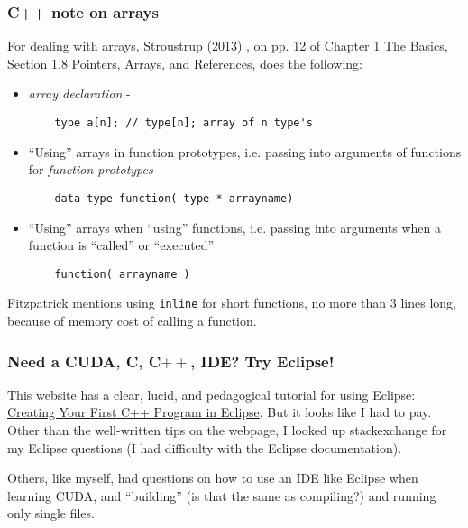 \documentclass[10pt]{amsart}
\begin{document}
\begin{multicols*}{2}
\subsubsection{C++ note on arrays}

For dealing with arrays, Stroustrup (2013) \cite{Stro2013}, on pp. 12 of Chapter 1 The Basics, Section 1.8 Pointers, Arrays, and References, does the following:

\begin{itemize}
\item \emph{array declaration} -
  \begin{lstlisting}
    type a[n]; // type[n]; array of n type's
  \end{lstlisting}
\item ``Using'' arrays in function prototypes, i.e. passing into arguments of functions for \emph{function prototypes}
  \begin{lstlisting}
    data-type function( type * arrayname)
    \end{lstlisting}
\item ``Using'' arrays when ``using'' functions, i.e. passing into arguments when a function is ``called'' or ``executed''
  \begin{lstlisting}
    function( arrayname )
  \end{lstlisting}
  \end{itemize}


Fitzpatrick \cite{Fitz} mentions using \verb|inline| for short functions, no more than 3 lines long, because of memory cost of calling a function.  




\subsubsection{Need a CUDA, C, C$++$, IDE?  Try Eclipse!}

This website has a clear, lucid, and pedagogical tutorial for using Eclipse: \href{https://www.fayewilliams.com/2011/06/28/creating-your-first-c-program-in-eclipse/}{Creating Your First C++ Program in Eclipse}.  But it looks like I had to pay.  Other than the well-written tips on the webpage, I looked up stackexchange for my Eclipse questions (I had difficulty with the Eclipse documentation).  

Others, like myself, had questions on how to use an IDE like Eclipse when learning CUDA, and ``building'' (is that the same as compiling?) and running only single files.  


\end{multicols*}
\end{document}
